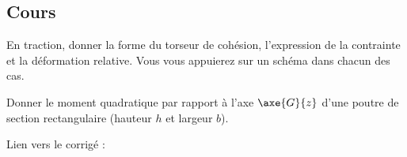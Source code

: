 \documentclass[10pt,fleqn]{article} %
\newcommand{\repRel}{../../..}
\newcommand{\repExo}{dossier}
\begin{document}
\begin{multicols}{2}
\section*{Cours}
En traction, donner la forme du torseur de cohésion, l'expression de la contrainte et la déformation relative. Vous vous appuierez sur un schéma dans chacun des cas. 

Donner le moment quadratique par rapport à l'axe $\axe{G}{z}$ d'une poutre de section rectangulaire (hauteur $h$ et largeur $b$).

\renewcommand{\repExo}{526_RdM}
\graphicspath{{\repRel/Style/png/}{\repRel/ExercicesCompetences/C2_MettreEnOeuvreDemarche/C2_10_RdM_Cohesion/\repExo/images/}}


\renewcommand{\repExo}{527_RdM}
\graphicspath{{\repRel/Style/png/}{\repRel/ExercicesCompetences/C2_MettreEnOeuvreDemarche/C2_10_RdM_Cohesion/\repExo/images/}}



\renewcommand{\repExo}{530_BancHelico}
\graphicspath{{\repRel/Style/png/}{\repRel/ExercicesCompetences/C2_MettreEnOeuvreDemarche/C2_10_RdM_Cohesion/\repExo/images/}}

\end{multicols}

Lien vers le corrigé : 

\end{document}
